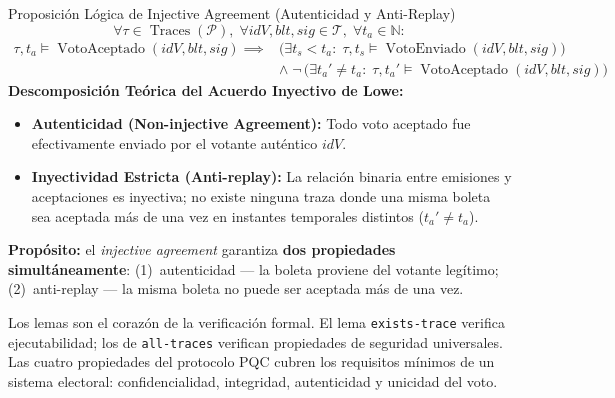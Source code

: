 \documentclass[12pt, a4paper, twoside, openright]{book}
\begin{document}
\begin{cajaLogica}{Proposici\'on L\'ogica de Injective Agreement (Autenticidad y Anti-Replay)}
  \[
    \forall \tau \in \operatorname{Traces}(\mathcal{P}),\; \forall \mathit{idV}, \mathit{blt}, \mathit{sig} \in \mathcal{T},\; \forall t_a \in \mathbb{N}:
  \]
  \[
    \begin{aligned}
      \tau, t_a \models \operatorname{VotoAceptado}(\mathit{idV}, \mathit{blt}, \mathit{sig}) \implies
      &\Big( \exists t_s < t_a:\; \tau, t_s \models \operatorname{VotoEnviado}(\mathit{idV}, \mathit{blt}, \mathit{sig}) \Big) \\
      &\land\; \neg\,\Big( \exists t_a' \neq t_a:\; \tau, t_a' \models \operatorname{VotoAceptado}(\mathit{idV}, \mathit{blt}, \mathit{sig}) \Big)
    \end{aligned}
  \]
  \textbf{Descomposici\'on Te\'orica del Acuerdo Inyectivo de Lowe:}
  \begin{itemize}[itemsep=2pt]
    \item \textbf{Autenticidad (Non-injective Agreement):} Todo voto aceptado fue efectivamente enviado por el votante aut\'entico $\mathit{idV}$.
    \item \textbf{Inyectividad Estricta (Anti-replay):} La relaci\'on binaria entre emisiones y aceptaciones es inyectiva; no existe ninguna traza donde una misma boleta sea aceptada m\'as de una vez en instantes temporales distintos ($t_a' \neq t_a$).
  \end{itemize}
\end{cajaLogica}

\textbf{Prop\'osito:} el \textit{injective agreement} garantiza
\textbf{dos propiedades simult\'aneamente}: (1)~autenticidad --- la
boleta proviene del votante leg\'itimo; (2)~anti-replay --- la misma
boleta no puede ser aceptada m\'as de una vez.

\begin{cajaResumen}
  Los lemas son el coraz\'on de la verificaci\'on formal. El lema
  \texttt{exists-trace} verifica ejecutabilidad; los de
  \texttt{all-traces} verifican propiedades de seguridad universales.
  Las cuatro propiedades del protocolo PQC cubren los requisitos
  m\'inimos de un sistema electoral: confidencialidad, integridad,
  autenticidad y unicidad del voto.
\end{cajaResumen}

\end{document}
